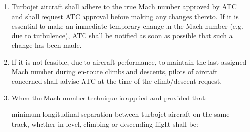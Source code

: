 \begin{enumeratesc}
    \begin{enumerate}
        \item Turbojet aircraft shall adhere to the true Mach number approved by ATC and shall request ATC approval before making any changes thereto. If it is essential to make an immediate temporary change in the Mach number (e.g. due to turbulence), ATC shall be notified as soon as possible that such a change has been made.
        \item If it is not feasible, due to aircraft performance, to maintain the last assigned Mach number during en-route climbs and descents, pilots of aircraft concerned shall advise ATC at the time of the climb/descent request.
        \item When the Mach number technique is applied and provided that:
        

        \noindent minimum longitudinal separation between turbojet aircraft on the same track, whether in level, climbing or descending flight shall be:            
        

\end{enumerate}
\end{enumeratesc}
